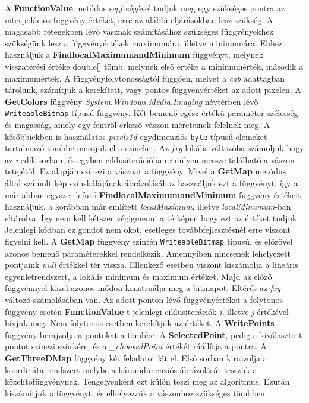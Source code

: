 			A \textbf{FunctionValue} metódus segítségével tudjuk meg egy szükséges pontra az interpolációs függvény értékét, erre az alábbi eljárásokban lesz szükség. A magasabb rétegekben lévő vásznak számításához szükséges függvényekhez szükségünk lesz a függvényértékek maximumára, illetve minimumára. Ehhez használjuk a \textbf{FindlocalMaximumandMinimum} függvényt, melynek visszatérési értéke double[] tömb, melynek első értéke a minimumérték, második a maximumérték. A függvényfolytonosságtól függően, melyet a \textit{cab} adattagban tárolunk, számítjuk a kerekített, vagy pontos függvényértéket az adott pixelen. A \textbf{GetColors} függvény \textit{System.Windows.Media.Imaging} névtérben lévő \texttt{WriteableBitmap} típusú függvény. Két bemenő egész értékű paraméter szélesség és magasság, amely egy fentről érkező vászon méreteinek felelnek meg. A későbbiekben is használatos \textit{pixels1d} egydimenziós \texttt{byte} típusú elemeket tartalmazó tömbbe mentjük el a színeket. Az \textit{fxy} lokális változóba számoljuk hogy az \textit{i}-edik sorban, és egyben ciklusiterációban \textit{i} milyen messze található a vászon tetejétől. Ez alapján színezi a vásznat a függvény. Mivel a \textbf{GetMap} metódus által számolt kép színskálájának ábrázolásához használjuk ezt a függvényt, így a már abban egyszer lefutó \textbf{FindlocalMaximumandMinimum} függvény értékeit használjuk, a korábban már említett \textit{localMaximum}, illetve \textit{localMinumum}-ban eltárolva. Így nem kell kétszer végigmenni a térképen hogy ezt az értéket tudjuk. Jelenlegi kódban ez gondot nem okot, esetleges továbbfejlesztésnél erre viszont figyelni kell. A \textbf{GetMap} függvény szintén \texttt{WriteableBitmap} típusú, és előzővel azonos bemenő paraméterekkel rendelkezik. Amennyiben nincsenek lehelyezett pontjaink \textit{null} értékkel tér vissza. Ellenkező esetben viszont kiszámolja a lineáris egyenletrendszert, a lokális minimum és maximum értéket, Majd az előző függvénnyel közel azonos módon konstruálja meg a bitmapot. Eltérés az \textit{fxy} változó számolásában van. Az adott ponton lévő függvényértéket a folytonos függvény esetén \textbf{FunctionValue}-t jelenlegi ciklusiterációk \textit{i}, illetve \textit{j} értékével hívjuk meg. Nem folytonos esetben kerekítjük az értéket. A \textbf{WritePoints} függvény berajzolja a pontokat a tömbbe. A \textbf{SelectedPoint}, pedig a kiválasztott pontot színezi szürkére, és a \textit{\_choosedPoint} értékét ráállítja a pontra. A \textbf{GetThreeDMap} függvény két feladatot lát el. Első sorban kirajzolja a koordináta rendszert melybe a háromdimenziós ábrázolását tesszük a közelítőfüggvénynek. Tengelyenként ezt külön teszi meg az algoritmus. Ezután kiszámítjuk a függvényt, és elhelyezzük a vászonhoz szükséges tömbben.
			
